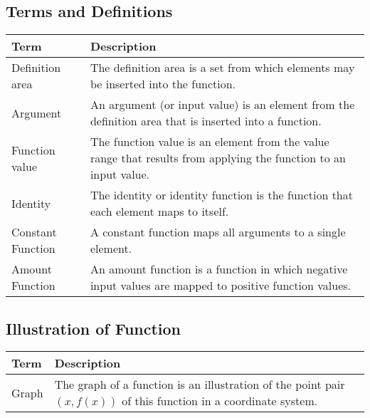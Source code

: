 \documentclass{book}
\begin{document}
\subsection{Terms and Definitions}
\begin{tabular}{p{3cm}p{10.5cm}}
  \toprule
  \textbf{Term} & \textbf{Description} \\
  \midrule
  Definition area & The definition area is a set from which elements may be inserted into the function.\\
  \midrule
  Argument & An argument (or input value) is an element from the definition area that is inserted into a function.\\
  \midrule
  Function value & The function value is an element from the value range that results from applying the function to an input value.\\
  \midrule
  Identity & The identity or identity function is the function that each element maps to itself.\\
  \midrule
  Constant Function & A constant function maps all arguments to a single element.\\ 
  \midrule
  Amount Function & An amount function is a function in which negative input values are mapped to positive function values.\\
  \bottomrule
\end{tabular}

\subsection{Illustration of Function}
\begin{tabular}{p{3cm}p{10.5cm}}
  \toprule
  \textbf{Term} & \textbf{Description} \\
  \midrule
  Graph & The graph of a function is an illustration of the point pair $(x, f(x))$ of this function in a coordinate system.\\
  \bottomrule
\end{tabular}
\end{document}
